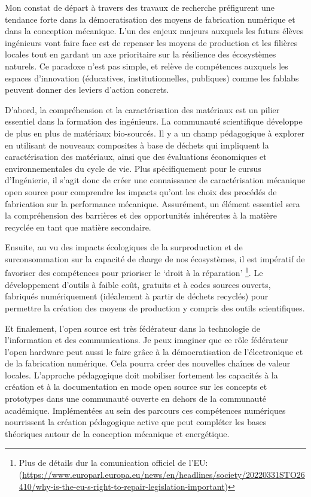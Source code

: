 \documentclass[
  12pt,
  oneside]{book}
\begin{document}
Mon constat de départ à travers des travaux de recherche préfigurent une tendance forte dans la démocratisation des moyens de fabrication numérique et dans la conception mécanique. L'un des enjeux majeurs auxquels les futurs élèves ingénieurs vont faire face est de repenser les moyens de production et les filières locales tout en gardant un axe prioritaire sur la résilience des écosystèmes naturels. Ce paradoxe n'est pas simple, et relève de compétences auxquels les espaces d'innovation (éducatives, institutionnelles, publiques) comme les fablabs peuvent donner des leviers d'action concrets.

D'abord, la compréhension et la caractérisation des matériaux est un pilier essentiel dans la formation des ingénieurs. La communauté scientifique développe de plus en plus de matériaux bio-sourcés. Il y a un champ pédagogique à explorer en utilisant de nouveaux composites à base de déchets qui impliquent la caractérisation des matériaux, ainsi que des évaluations économiques et environnementales du cycle de vie.
Plus spécifiquement pour le cursus d'Ingénierie, il s'agit donc de créer une connaissance de caractérisation mécanique open source pour comprendre les impacts qu'ont les choix des procédés de fabrication sur la performance mécanique. Assurément, un élément essentiel sera la compréhension des barrières et des opportunités inhérentes à la matière recyclée en tant que matière secondaire.

Ensuite, au vu des impacts écologiques de la surproduction et de surconsommation sur la capacité de charge de nos écosystèmes, il est impératif de favoriser des compétences pour prioriser le `droit à la réparation' \footnote{Plus de détails dur la comunication officiel de l'EU: (\url{https://www.europarl.europa.eu/news/en/headlines/society/20220331STO26410/why-is-the-eu-s-right-to-repair-legislation-important})}.
Le développement d'outils à faible coût, gratuits et à codes sources ouverts, fabriqués numériquement (idéalement à partir de déchets recyclés) pour permettre la création des moyens de production y compris des outils scientifiques.

Et finalement, l'open source est très fédérateur dans la technologie de l'information et des communications. Je peux imaginer que ce rôle fédérateur l'open hardware peut aussi le faire grâce à la démocratisation de l'électronique et de la fabrication numérique.
Cela pourra créer des nouvelles chaînes de valeur locales. L'approche pédagogique doit mobiliser fortement les capacités à la création et à la documentation en mode open source sur les concepts et prototypes dans une communauté ouverte en dehors de la communauté académique. Implémentées au sein des parcours ces compétences numériques nourrissent la création pédagogique active que peut compléter les bases théoriques autour de la conception mécanique et energétique.
\end{document}
